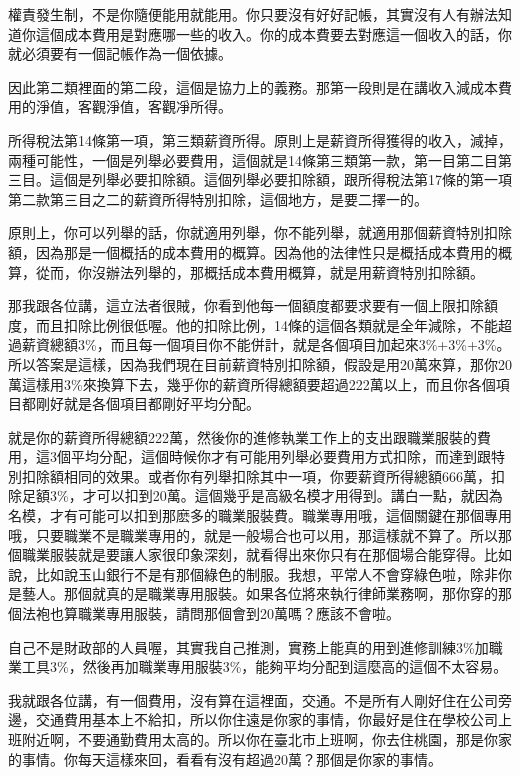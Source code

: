 \documentclass[]{ctexbook}
\begin{document}
權責發生制，不是你隨便能用就能用。你只要沒有好好記帳，其實沒有人有辦法知道你這個成本費用是對應哪一些的收入。你的成本費要去對應這一個收入的話，你就必須要有一個記帳作為一個依據。

因此第二類裡面的第二段，這個是協力上的義務。那第一段則是在講收入減成本費用的淨值，客觀淨值，客觀凈所得。

所得稅法第14條第一項，第三類薪資所得。原則上是薪資所得獲得的收入，減掉，兩種可能性，一個是列舉必要費用，這個就是14條第三類第一款，第一目第二目第三目。這個是列舉必要扣除額。這個列舉必要扣除額，跟所得稅法第17條的第一項第二款第三目之二的薪資所得特別扣除，這個地方，是要二擇一的。

原則上，你可以列舉的話，你就適用列舉，你不能列舉，就適用那個薪資特別扣除額，因為那是一個概括的成本費用的概算。因為他的法律性只是概括成本費用的概算，從而，你沒辦法列舉的，那概括成本費用概算，就是用薪資特別扣除額。

那我跟各位講，這立法者很賊，你看到他每一個額度都要求要有一個上限扣除額度，而且扣除比例很低喔。他的扣除比例，14條的這個各類就是全年減除，不能超過薪資總額3\%，而且每一個項目你不能併計，就是各個項目加起來3\%+3\%+3\%。所以答案是這樣，因為我們現在目前薪資特別扣除額，假設是用20萬來算，那你20萬這樣用3\%來換算下去，幾乎你的薪資所得總額要超過222萬以上，而且你各個項目都剛好就是各個項目都剛好平均分配。

就是你的薪資所得總額222萬，然後你的進修執業工作上的支出跟職業服裝的費用，這3個平均分配，這個時候你才有可能用列舉必要費用方式扣除，而達到跟特別扣除額相同的效果。或者你有列舉扣除其中一項，你要薪資所得總額666萬，扣除足額3\%，才可以扣到20萬。這個幾乎是高級名模才用得到。講白一點，就因為名模，才有可能可以扣到那麽多的職業服裝費。職業專用哦，這個關鍵在那個專用哦，只要職業不是職業專用的，就是一般場合也可以用，那這樣就不算了。所以那個職業服裝就是要讓人家很印象深刻，就看得出來你只有在那個場合能穿得。比如說，比如說玉山銀行不是有那個綠色的制服。我想，平常人不會穿綠色啦，除非你是藝人。那個就真的是職業專用服裝。如果各位將來執行律師業務啊，那你穿的那個法袍也算職業專用服裝，請問那個會到20萬嗎？應該不會啦。

自己不是財政部的人員喔，其實我自己推測，實務上能真的用到進修訓練3\%加職業工具3\%，然後再加職業專用服裝3\%，能夠平均分配到這麼高的這個不太容易。

我就跟各位講，有一個費用，沒有算在這裡面，交通。不是所有人剛好住在公司旁邊，交通費用基本上不給扣，所以你住遠是你家的事情，你最好是住在學校公司上班附近啊，不要通勤費用太高的。所以你在臺北市上班啊，你去住桃園，那是你家的事情。你每天這樣來回，看看有沒有超過20萬？那個是你家的事情。
\end{document}

